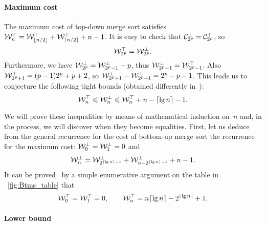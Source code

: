 \paragraph{Maximum cost}

The maximum cost of top-down merge sort satisfies \(\mathcal{W}_{n}^{\top} =
\mathcal{W}_{\lfloor{n/2}\rfloor}^{\top} + \mathcal{W}_{\lceil{n/2}\rceil}^{\top} + n - 1\). It is easy
to check that \(\mathcal{C}_{2^p}^{\bot} = \mathcal{C}_{2^p}^{\top}\), so
\begin{equation}
\mathcal{W}_{2^p}^{\top} = \mathcal{W}_{2^p}^{\bot}.
\label{eq:2p}
\end{equation}
Furthermore, we have \(\mathcal{W}_{2^p}^{\bot} = \mathcal{W}_{2^p-1}^{\bot} + p\), thus
\(\mathcal{W}_{2^p-1}^{\bot} = \mathcal{W}_{2^p-1}^{\top}\).  Also \(\mathcal{W}_{2^p+1}^{\top} =
(p-1)2^p + p + 2\), so \(\mathcal{W}_{2^p+1}^{\bot} - \mathcal{W}_{2^p+1}^{\top} = 2^p - p -
1\). This leads us to conjecture the following tight bounds (obtained
differently in~\cite{PannyProdinger:1995}):
\begin{equation*}
\mathcal{W}_{n}^{\top} \leqslant \mathcal{W}_{n}^{\bot} \leqslant
\mathcal{W}_{n}^{\top} + n - \lceil{\lg n}\rceil - 1.
\end{equation*}

We will prove these inequalities by means of mathematical induction
on~\(n\) and, in the process, we will discover when they become
equalities. First, let us deduce from the general recurrence for the
cost of bottom-up merge sort the recurrence for the maximum cost:
\(\mathcal{W}_{0}^{\bot} = \mathcal{W}_{1}^{\bot} = 0\) and
\begin{equation}
\mathcal{W}_{n}^{\bot} =
\mathcal{W}_{2^{\lceil{\lg n}\rceil-1}}^{\bot} +
\mathcal{W}_{n-2^{\lceil{\lg n}\rceil-1}}^{\bot} + n - 1.
\label{eq:bot}
\end{equation}
It can be proved~\cite[Theorem~2.4, page~66]{SedgewickFlajolet:1996}
by a simple enumerative argument on the table in
\fig~\ref{fig:Btms_table} that
\begin{equation}
\mathcal{W}_{0}^{\top} = \mathcal{W}_{1}^{\top} = 0,
\qquad
\mathcal{W}_{n}^{\top} = n\lceil{\lg n}\rceil - 2^{\lceil{\lg n}\rceil} + 1.
\label{eq:top}
\end{equation}

\paragraph{Lower bound}

